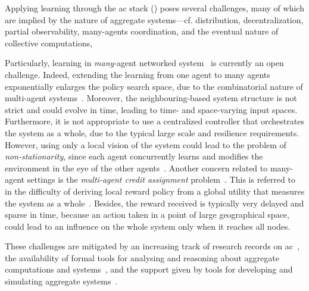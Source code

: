 Applying learning through the \ac{ac} stack () poses several challenges,
 many of which are implied by 
 the nature of aggregate systems---cf.
 distribution, 
 decentralization, 
 partial observability,
 many-agents coordination, and
 the eventual nature of collective computations,
  

Particularly, learning in \emph{many}-agent networked system~\cite{DBLP:journals/jzusc/ZhangYB21} is currently an open challenge.
%
Indeed, extending the learning from one agent to many agents exponentially enlarges the policy search space, due to the combinatorial nature of multi-agent systems~\cite{DBLP:journals/aamas/Hernandez-LealK19}.
%
Moreover, the neighbouring-based system structure is not strict and could evolve in time, leading to time- and space-varying input spaces.
%
Furthermore, it is not appropriate to use a centralized controller that orchestrates the system as a whole, due to the typical large scale and resilience requirements.
%
However, using only a local vision of the system could lead to the problem of \emph{non-stationarity}, since each agent concurrently learns and modifies the environment in the eye of the other agents~\cite{DBLP:journals/aim/TuylsW12}.
%
Another concern related to many-agent settings is the \emph{multi-agent credit assignment} problem~\cite{sutton-book}.
%
This is referred to in the difficulty of deriving local reward policy from a global utility that measures the system as a whole~\cite{DBLP:conf/atal/AgoginoT04}. 
%
Besides, the reward received is typically very delayed and sparse in time, because an action taken in a point of large geographical space, could lead to an influence on the whole system only when it reaches all nodes.

These challenges are mitigated 
 by an increasing track of research records on \ac{ac}~\cite{DBLP:journals/jlap/ViroliBDACP19},
 the availability of formal tools for 
 analysing and reasoning about aggregate computations and systems~\cite{DBLP:journals/jlap/ViroliBDACP19},
 and the support given by tools for 
 developing and simulating aggregate systems~\cite{DBLP:journals/jlap/ViroliBDACP19}.
